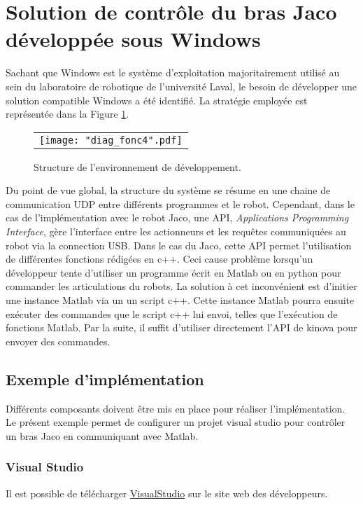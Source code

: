 \documentclass[root.tex]{subfiles}
\begin{document}
\section{Solution de contrôle du bras Jaco développée sous Windows}

Sachant que Windows est le système d'exploitation majoritairement utilisé au sein du laboratoire de robotique de l'université Laval, le besoin de développer une solution compatible Windows a été identifié. 
La stratégie employée est représentée dans la Figure \ref{fig:diag}.
\begin{figure}
 \begin{center}
  \begin{tabular}{c}
    \texttt{[image: "diag\_fonc4".pdf]}
  \end{tabular}
 \end{center}
\caption{Structure de l'environnement de développement.}
 \label{fig:diag}
\end{figure}
Du point de vue global, la structure du système se résume en une chaine de communication UDP entre différents programmes et le robot. 
Cependant, dans le cas de l'implémentation avec le robot Jaco, une API, \textit{Applications Programming Interface}, gère l'interface entre les actionneurs et les requêtes communiquées au robot via la connection USB.
Dans le cas du Jaco, cette API permet l'utilisation de différentes fonctions rédigées en c++.
Ceci cause problème lorsqu'un développeur tente d'utiliser un programme écrit en Matlab ou en python pour commander les articulations du robots.
La solution à cet inconvénient est d'initier une instance Matlab via un un script c++.
Cette instance Matlab pourra ensuite exécuter des commandes que le script c++ lui envoi, telles que l’exécution de fonctions Matlab.
Par la suite, il suffit d'utiliser directement l'API de kinova pour envoyer des commandes.

\subsection{Exemple d'implémentation}

Différents composants doivent être mis en place pour réaliser l'implémentation.
Le présent exemple permet de configurer un projet visual studio pour contrôler un bras Jaco en communiquant avec Matlab.
\subsubsection{Visual Studio}
Il est possible de télécharger \href{https://www.visualstudio.com/thank-you-downloading-visual-studio/?sku=Community&rel=15}{VisualStudio} sur le site web des développeurs.
\end{document}
